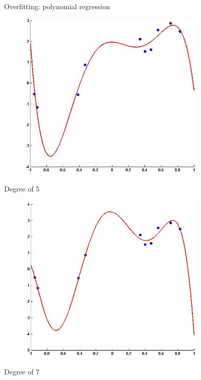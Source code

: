 \documentclass[serif, aspectratio=169]{beamer}
\begin{document}
\begin{frame}{Overfitting: polynomial regression}
    \begin{minipage}{0.45\textwidth}
        \centering
        \begin{figure}[h]
        \includegraphics[width=0.8\textwidth]{pic/Polynomial_regression/degree_5.png}
        \end{figure}
        \begin{center}
            Degree of 5
        \end{center}
    \end{minipage}%
    \begin{minipage}{0.45\textwidth}
        \centering
        \begin{figure}[h]
        \includegraphics[width=0.8\textwidth]{pic/Polynomial_regression/degree_7.png}
        \end{figure}
        \begin{center}
            Degree of 7
        \end{center}
    \end{minipage}
    \vfill
\end{frame}
\end{document}
